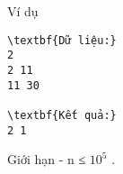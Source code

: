 Ví dụ
\begin{verbatim}
\textbf{Dữ liệu:}
2
2 11
11 30

\textbf{Kết quả:}
2 1
\end{verbatim}
Giới hạn
- n ≤ $10^{5}$   .